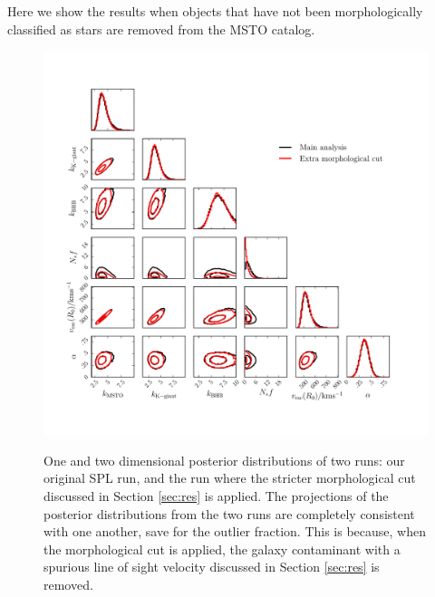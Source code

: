 \documentclass[useAMS,twocolumn,usenatbib]{mn2e}
\begin{document}
Here we show the results when objects that have not been morphologically classified as stars are removed from the MSTO catalog.

\begin{figure}
\includegraphics[width=2\columnwidth]{plots/morphological_comparison_corner}\\
\caption{One and two dimensional posterior distributions of two runs: our original SPL run, and the run where the stricter morphological cut discussed in Section \ref{sec:res} is applied.
The projections of the posterior distributions from the two runs are completely consistent with one another, save for the outlier fraction.
This is because, when the morphological cut is applied, the galaxy contaminant with a spurious line of sight velocity discussed in Section \ref{sec:res} is removed.}
\label{fig:morph_corner}
\end{figure}

\label{sec:morph}
\end{document}
